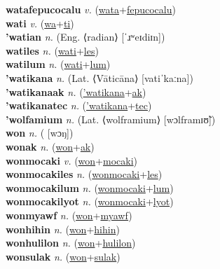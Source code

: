 \textbf{watafepucocalu} \textit{v.} (\hyperref[wata]{wata}+\hyperref[fepucocalu]{fepucocalu})
 \label{watafepucocalu} \\
\textbf{wati} \textit{v.} (\hyperref[wa]{wa}+\hyperref[ti]{ti})
 \label{wati} \\
\textbf{'watian} \textit{n.} (Eng. ⟨radian⟩ [ˈɹʷeɪdiɪn])
 \label{'watian} \\
\textbf{watiles} \textit{n.} (\hyperref[wati]{wati}+\hyperref[les]{les})
 \label{watiles} \\
\textbf{watilum} \textit{n.} (\hyperref[wati]{wati}+\hyperref[lum]{lum})
 \label{watilum} \\
\textbf{'watikana} \textit{n.} (Lat. ⟨Vāticāna⟩ [vatiˈkaːna])
 \label{'watikana} \\
\textbf{'watikanaak} \textit{n.} (\hyperref['watikana]{'watikana}+\hyperref[ak]{ak})
 \label{'watikanaak} \\
\textbf{'watikanatec} \textit{n.} (\hyperref['watikana]{'watikana}+\hyperref[tec]{tec})
 \label{'watikanatec} \\
\textbf{'wolfamium} \textit{n.} (Lat. ⟨wolframium⟩ [wɔlframɪʊ̃])
 \label{'wolfamium} \\
\textbf{won} \textit{n.} ( [wɔŋ])
 \label{won} \\
\textbf{wonak} \textit{n.} (\hyperref[won]{won}+\hyperref[ak]{ak})
 \label{wonak} \\
\textbf{wonmocaki} \textit{v.} (\hyperref[won]{won}+\hyperref[mocaki]{mocaki})
 \label{wonmocaki} \\
\textbf{wonmocakiles} \textit{n.} (\hyperref[wonmocaki]{wonmocaki}+\hyperref[les]{les})
 \label{wonmocakiles} \\
\textbf{wonmocakilum} \textit{n.} (\hyperref[wonmocaki]{wonmocaki}+\hyperref[lum]{lum})
 \label{wonmocakilum} \\
\textbf{wonmocakilyot} \textit{n.} (\hyperref[wonmocaki]{wonmocaki}+\hyperref[lyot]{lyot})
 \label{wonmocakilyot} \\
\textbf{wonmyawf} \textit{n.} (\hyperref[won]{won}+\hyperref[myawf]{myawf})
 \label{wonmyawf} \\
\textbf{wonhihin} \textit{n.} (\hyperref[won]{won}+\hyperref[hihin]{hihin})
 \label{wonhihin} \\
\textbf{wonhulilon} \textit{n.} (\hyperref[won]{won}+\hyperref[hulilon]{hulilon})
 \label{wonhulilon} \\
\textbf{wonsulak} \textit{n.} (\hyperref[won]{won}+\hyperref[sulak]{sulak})
 \label{wonsulak} \\
